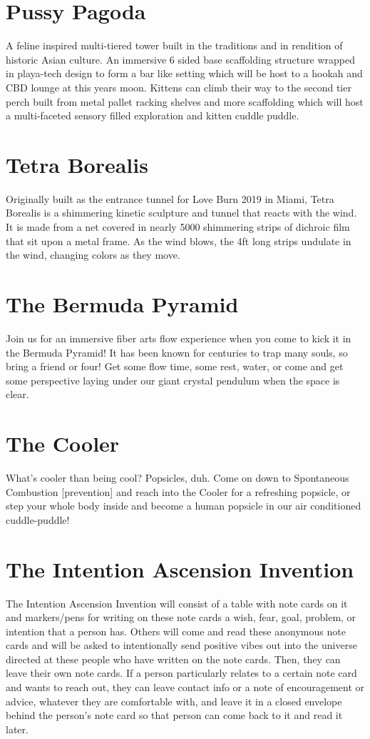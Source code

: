 \section*{Pussy Pagoda}
A feline inspired multi-tiered tower built in the traditions and in rendition of historic Asian culture. An immersive 6 sided base scaffolding structure wrapped in playa-tech design to form a bar like setting which will be host to a hookah and CBD lounge at this years moon. Kittens can climb their way to the second tier perch built from metal pallet racking shelves and more scaffolding which will host a multi-faceted sensory filled exploration and kitten cuddle puddle.

\section*{Tetra Borealis}
Originally built as the entrance tunnel for Love Burn 2019 in Miami, Tetra Borealis is a shimmering kinetic sculpture and tunnel that reacts with the wind. It is made from a net covered in nearly 5000 shimmering strips of dichroic film that sit upon a metal frame. As the wind blows, the 4ft long strips undulate in the wind, changing colors as they move.


\section*{The Bermuda Pyramid}
Join us for an immersive fiber arts flow experience when you come to kick it in the Bermuda Pyramid! It has been known for centuries to trap many souls, so bring a friend or four! Get some flow time, some rest, water, or come and get some perspective laying under our giant crystal pendulum when the space is clear.


\section*{The Cooler}
What's cooler than being cool? Popsicles, duh. Come on down to Spontaneous Combustion [prevention] and reach into the Cooler for a refreshing popsicle, or step your whole body inside and become a human popsicle in our air conditioned cuddle-puddle!  


\section*{The Intention Ascension Invention}
The Intention Ascension Invention will consist of a table with note cards on it and markers/pens for writing on these note cards a wish, fear, goal, problem, or intention that a person has. Others will come and read these anonymous note cards and will be asked to intentionally send positive vibes out into the universe directed at these people who have written on the note cards. Then, they can leave their own note cards. If a person particularly relates to a certain note card and wants to reach out, they can leave contact info or a note of encouragement or advice, whatever they are comfortable with, and leave it in a closed envelope behind the person’s note card so that person can come back to it and read it later. 
 


